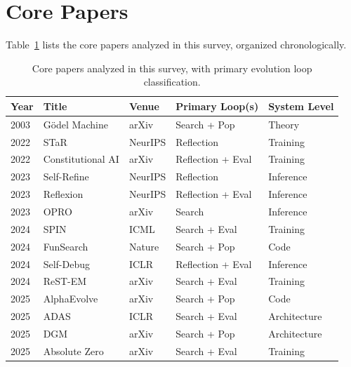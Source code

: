 \documentclass[11pt,a4paper]{article}
\begin{document}
\section{Core Papers}
\label{app:papers}

Table~\ref{tab:papers} lists the core papers analyzed in this survey, organized chronologically.

\begin{table}[t]
\centering
\caption{Core papers analyzed in this survey, with primary evolution loop classification.}
\label{tab:papers}
\small
\begin{tabular}{@{}p{1cm}p{3.5cm}p{1.8cm}p{2cm}p{2cm}@{}}
\toprule
\textbf{Year} & \textbf{Title} & \textbf{Venue} & \textbf{Primary Loop(s)} & \textbf{System Level} \\
\midrule
2003 & G\"{o}del Machine & arXiv & Search + Pop & Theory \\
2022 & STaR & NeurIPS & Reflection & Training \\
2022 & Constitutional AI & arXiv & Reflection + Eval & Training \\
2023 & Self-Refine & NeurIPS & Reflection & Inference \\
2023 & Reflexion & NeurIPS & Reflection + Eval & Inference \\
2023 & OPRO & arXiv & Search & Inference \\
2024 & SPIN & ICML & Search + Eval & Training \\
2024 & FunSearch & Nature & Search + Pop & Code \\
2024 & Self-Debug & ICLR & Reflection + Eval & Inference \\
2024 & ReST-EM & arXiv & Search + Eval & Training \\
2025 & AlphaEvolve & arXiv & Search + Pop & Code \\
2025 & ADAS & ICLR & Search + Eval & Architecture \\
2025 & DGM & arXiv & Search + Pop & Architecture \\
2025 & Absolute Zero & arXiv & Search + Eval & Training \\
\bottomrule
\end{tabular}
\end{table}



\end{document}
